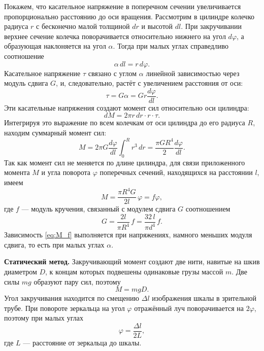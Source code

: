 \documentclass[12pt,a4paper]{article}
\begin{document}
Покажем, что касательное напряжение в поперечном сечении увеличивается пропорционально расстоянию до оси вращения.
Рассмотрим в цилиндре колечко радиуса $r$ с бесконечно малой толщиной $dr$ и высотой $dl$.
При закручивании верхнее сечение колечка поворачивается относительно нижнего на угол $d\varphi$,
а образующая наклоняется на угол $\alpha$. Тогда при малых углах справедливо соотношение
\begin{equation}
    \alpha\,dl = r\,d\varphi.
    \label{eq:alpha}
\end{equation}
Касательное напряжение $\tau$ связано с углом $\alpha$ линейной зависимостью через модуль сдвига $G$, и, следовательно,
растёт с увеличением расстояния от оси:
\begin{equation}
    \tau = G\alpha = G r \frac{d\varphi}{dl}.
    \label{eq:tau}
\end{equation}
Эти касательные напряжения создают момент сил относительно оси цилиндра:
\begin{equation}
    dM = 2\pi r\,dr\cdot r\cdot\tau.
\end{equation}
Интегрируя это выражение по всем колечкам от оси цилиндра до его радиуса $R$, находим суммарный момент сил:
\begin{equation}
    M = 2\pi G \frac{d\varphi}{dl}\int_0^R r^3\,dr = \frac{\pi G R^4}{2}\frac{d\varphi}{dl}.
    \label{eq:M_int}
\end{equation}
Так как момент сил не меняется по длине цилиндра, для связи приложенного момента $M$ и угла поворота $\varphi$
поперечных сечений, находящихся на расстоянии $l$, имеем
\begin{equation}
    M = \frac{\pi R^4 G}{2l}\,\varphi = f\varphi,
    \label{eq:M_f}
\end{equation}
где $f$ --- модуль кручения, связанный с модулем сдвига $G$ соотношением
\begin{equation}
    G = \frac{2l}{\pi R^4}\,f = \frac{32\,l}{\pi d^4}\,f.
    \label{eq:G}
\end{equation}
Зависимость \eqref{eq:M_f} выполняется при напряжениях, намного меньших модуля сдвига, то есть при малых углах $\alpha$.

\textbf{Статический метод.} Закручивающий момент создают две нити, навитые на шкив диаметром $D$, к концам которых подвешены
одинаковые грузы массой $m$. Две силы $mg$ образуют пару сил, поэтому
\begin{equation}
    M = mgD.
    \label{eq:M_static}
\end{equation}
Угол закручивания находится по смещению $\Delta l$ изображения шкалы в зрительной трубе. При повороте зеркальца на угол $\varphi$
отражённый луч поворачивается на $2\varphi$, поэтому при малых углах
\begin{equation}
    \varphi = \frac{\Delta l}{2L},
    \label{eq:phi}
\end{equation}
где $L$ --- расстояние от зеркальца до шкалы.
\end{document}

